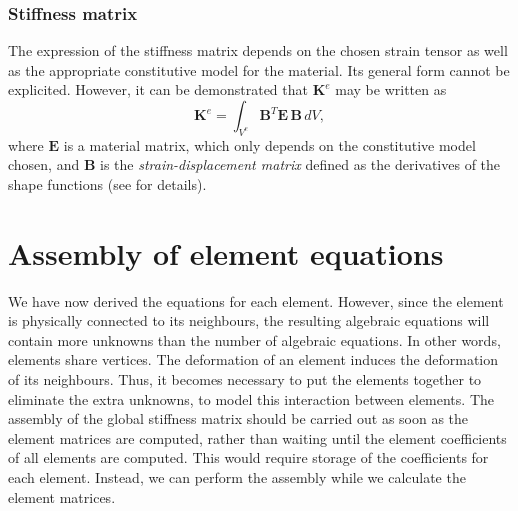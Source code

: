 		
		\subsubsection*{Stiffness matrix}
The expression of the stiffness matrix depends on the chosen strain tensor as well as the appropriate constitutive model for the material. Its general form cannot be explicited. However, it can be demonstrated that $ \mathbf{K}^e $ may be written as
\begin{equation}
\mathbf{K}^e = \int_{V^e} \mathbf{B}^T \mathbf{E} \, \mathbf{B} \, dV,
\end{equation}
where $ \mathbf{E} $ is a material matrix, which only depends on the constitutive model chosen, and $ \mathbf{B} $ is the \emph{strain-displacement matrix} defined as the derivatives of the shape functions (see \cite{Liu03,Belytschko00} for details). 
	
	

\section{Assembly of element equations}
We have now derived the equations for each element. However, since the element is physically connected to its neighbours, the resulting algebraic equations will contain more unknowns than the number of algebraic equations. In other words, elements share vertices. The deformation of an element induces the deformation of its neighbours. Thus, it becomes necessary to put the elements together to eliminate the extra unknowns, to model this interaction between elements. The assembly of the global stiffness matrix should be carried out as soon as the element matrices are computed, rather than waiting until the element coefficients of all elements are computed. This would require storage of the coefficients for each element. Instead, we can perform the assembly while we calculate the element matrices.  

